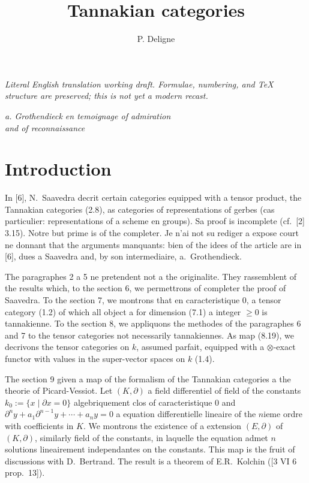 \documentclass[12pt,a4paper]{article}
\title{Tannakian categories}
\author{P. Deligne}
\date{}
\theoremstyle{plain}
\theoremstyle{definition}
\theoremstyle{remark}
\begin{document}
\begin{center}\small\emph{Literal English translation working draft. Formulae, numbering, and TeX structure are preserved; this is not yet a modern recast.}\end{center}
\vspace{0.5em}


\maketitle

\begin{center}
\textit{a. Grothendieck en temoignage of admiration}\\
\textit{and of reconnaissance}
\end{center}

\tableofcontents

\section{Introduction}

In [6], N.~Saavedra decrit certain categories equipped with a tensor product, the Tannakian categories (2.8), as categories of representations of gerbes (cas particulier: representations of a scheme en groups). Sa proof is incomplete (cf.~[2] 3.15). Notre but prime is of the completer. Je n'ai not su rediger a expose court ne donnant that the arguments manquants: bien of the idees of the article are in [6], dues a Saavedra and, by son intermediaire, a.~Grothendieck.

The paragraphes 2 a 5 ne pretendent not a the originalite. They rassemblent of the results which, to the section 6, we permettrons of completer the proof of Saavedra. To the section 7, we montrons that en caracteristique 0, a tensor category (1.2) of which all object a for dimension (7.1) a integer $\geq 0$ is tannakienne. To the section 8, we appliquons the methodes of the paragraphes 6 and 7 to the tensor categories not necessarily tannakiennes. As map (8.19), we decrivons the tensor categories on $k$, assumed parfait, equipped with a $\otimes$-exact functor with values in the super-vector spaces on $k$ (1.4).

The section 9 given a map of the formalism of the Tannakian categories a the theorie of Picard-Vessiot. Let $(K,\partial)$ a field differentiel of field of the constants $k_0 := \{x \mid \partial x = 0\}$ algebriquement clos of caracteristique 0 and $\partial^n y + a_1 \partial^{n-1} y + \cdots + a_n y = 0$ a equation differentielle lineaire of the $n$ieme ordre with coefficients in $K$. We montrons the existence of a extension $(E,\partial)$ of $(K,\partial)$, similarly field of the constants, in laquelle the equation admet $n$ solutions lineairement independantes on the constants. This map is the fruit of discussions with D.~Bertrand. The result is a theorem of E.R.~Kolchin ([3 VI 6 prop.~13]).
\end{document}
